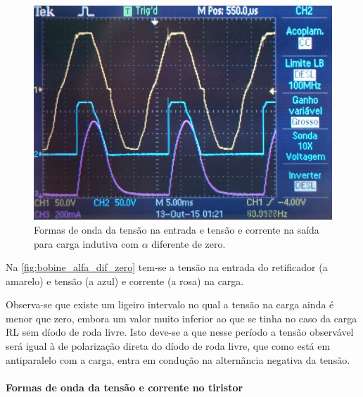 \documentclass[a4paper,11pt]{article}
\numberwithin{equation}{section}
\begin{document}
\begin{figure}[h]
	\centering
	\includegraphics[keepaspectratio=true, scale=0.11]{img/figs/bobine_alfa_dif_zero}
	\caption{Formas de onda da tensão na entrada e tensão e corrente na saída para carga indutiva com $\alpha$ diferente de zero.}
	\label{fig:bobine_alfa_dif_zero}
	\vspace{-0.8em}
\end{figure}

Na \autoref{fig:bobine_alfa_dif_zero} tem-se a tensão na entrada do retificador (a amarelo) e tensão (a azul) e corrente (a rosa) na carga.

Observa-se que existe um ligeiro intervalo no qual a tensão na carga ainda é menor que zero, embora um valor muito inferior ao que se tinha no caso da carga RL sem díodo de roda livre. Isto deve-se a que nesse período a tensão observável será igual à de polarização direta do díodo de roda livre, que como está em antiparalelo com a carga, entra em condução na alternância negativa da tensão. 

\paragraph{Formas de onda da tensão e corrente no tiristor}\mbox{}\
\end{document}
